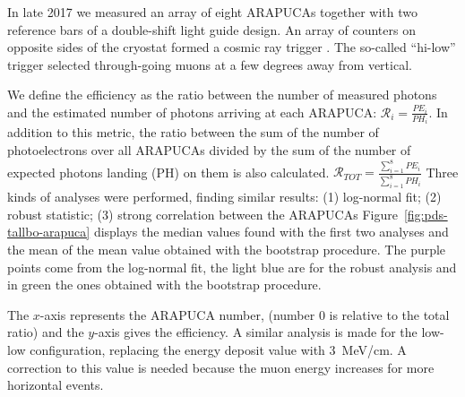 In late 2017 we measured an array of eight ARAPUCAs together with two reference bars of a double-shift light guide design. An array of counters on opposite sides of the cryostat formed a cosmic ray trigger . The so-called ``hi-low'' trigger selected through-going muons at a few degrees away from vertical.

We define the efficiency as the ratio between the number of measured photons and the estimated number of photons arriving at each ARAPUCA:
$\mathcal{R}_{i}=\frac{PE_i}{PH_i}$.
In addition to this metric, the ratio between the sum of the number of photoelectrons over all ARAPUCAs divided by the sum of the number of expected photons landing (PH) on them is also calculated. 
$\mathcal{R}_{TOT}=\frac{\sum_{i=1}^8PE_i}{\sum_{i=1}^8PH_i}$
Three kinds of analyses were performed, finding similar results:
(1)  log-normal fit; (2) robust statistic; (3) strong correlation between the ARAPUCAs
Figure~\ref{fig:pds-tallbo-arapuca} displays the median values found with the first two analyses and the mean of the mean value obtained with the bootstrap procedure.
The purple points come from the log-normal fit, the light blue are for the robust analysis and in green the ones obtained with the bootstrap procedure.

The $x$-axis represents the ARAPUCA number, (number 0 is relative to the total ratio) and the $y$-axis gives the efficiency. A similar analysis is made for the low-low configuration, replacing the energy deposit value with \SI{3}{MeV/cm}. A correction to this value is needed because the muon energy increases for more horizontal events.

